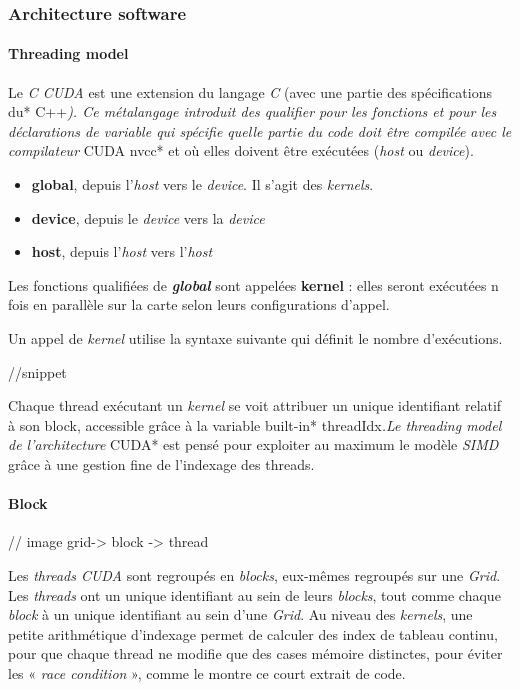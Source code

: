 \documentclass[french, 11pt]{memoir}
\begin{document}
\subsubsection{Architecture software}\label{architecture-software}

\paragraph{Threading model}\label{threading-model}

Le \emph{C CUDA} est une extension du langage \emph{C} (avec une partie
des spécifications du* C++\emph{). Ce métalangage introduit des
	qualifier pour les fonctions et pour les déclarations de variable qui
	spécifie quelle partie du code doit être compilée avec le compilateur
}CUDA nvcc* et où elles doivent être exécutées (\emph{host} ou
\emph{device}).

\begin{itemize}
	\item
	\textbf{global}, depuis l'\emph{host} vers le \emph{device}. Il s'agit
	des \emph{kernels}.
	\item
	\textbf{device}, depuis le \emph{device} vers la \emph{device}
	\item
	\textbf{host}, depuis l'\emph{host} vers l'\emph{host}
\end{itemize}

Les fonctions qualifiées de \emph{\textbf{global}} sont appelées
\textbf{kernel} : elles seront exécutées n fois en parallèle sur la
carte selon leurs configurations d'appel.

Un appel de \emph{kernel} utilise la syntaxe suivante qui définit le
nombre d'exécutions.

//snippet

Chaque thread exécutant un \emph{kernel} se voit attribuer un unique
identifiant relatif à son block, accessible grâce à la variable
built-in* threadIdx\emph{.Le threading model de l'architecture }CUDA*
est pensé pour exploiter au maximum le modèle \emph{SIMD} grâce à une
gestion fine de l'indexage des threads.

\paragraph{Block}\label{block}

// image grid-\textgreater{} block -\textgreater{} thread

Les \emph{threads CUDA} sont regroupés en \emph{blocks}, eux-mêmes
regroupés sur une \emph{Grid}. Les \emph{threads} ont un unique
identifiant au sein de leurs \emph{blocks}, tout comme chaque
\emph{block} à un unique identifiant au sein d'une \emph{Grid}. Au
niveau des \emph{kernels}, une petite arithmétique d'indexage permet de
calculer des index de tableau continu, pour que chaque thread ne modifie
que des cases mémoire distinctes, pour éviter les « \emph{race condition
}», comme le montre ce court extrait de code.
\end{document}
